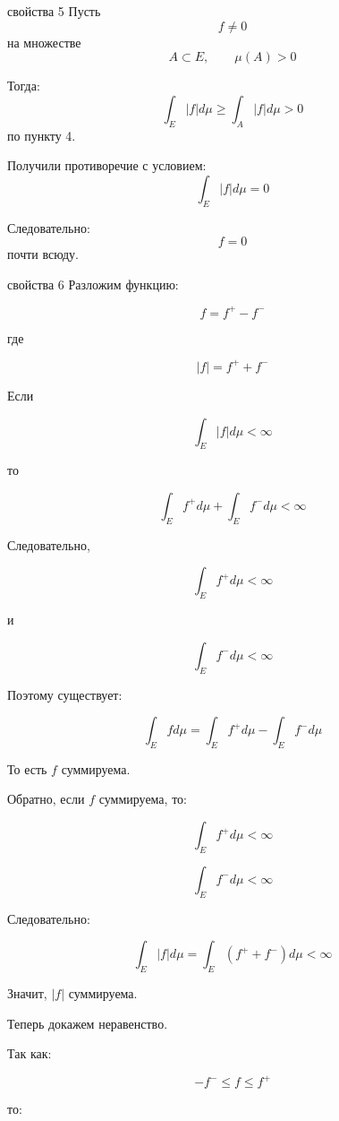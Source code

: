 \documentclass[12pt,a4paper]{article}
\begin{document}
\begin{proofbox}{свойства 5}
    Пусть
    \[
        f\neq0
    \]
    на множестве
    \[
        A\subset E,
        \qquad
        \mu(A)>0
    \]

    Тогда:
    \[
        \int_E|f| d\mu
        \geq
        \int_A|f| d\mu>0
    \]
    по пункту 4.

    Получили противоречие с условием:
    \[
        \int_E|f| d\mu=0
    \]

    Следовательно:
    \[
        f=0
    \]
    почти всюду.
\end{proofbox}

\begin{proofbox}{свойства 6}
    Разложим функцию:

    \[
        f=f^+-f^-
    \]

    где

    \[
        |f|=f^++f^-
    \]

    Если

    \[
        \int_E |f| d\mu<\infty
    \]

    то

    \[
        \int_E f^+ d\mu
        +
        \int_E f^- d\mu
        <\infty
    \]

    Следовательно,

    \[
        \int_E f^+ d\mu<\infty
    \]

    и

    \[
        \int_E f^- d\mu<\infty
    \]

    Поэтому существует:

    \[
        \int_E f d\mu
        =
        \int_E f^+ d\mu
        -
        \int_E f^- d\mu
    \]

    То есть $f$ суммируема.

    Обратно, если $f$ суммируема, то:

    \[
        \int_E f^+ d\mu<\infty
    \]

    \[
        \int_E f^- d\mu<\infty
    \]

    Следовательно:

    \[
        \int_E|f| d\mu
        =
        \int_E(f^++f^-) d\mu
        <\infty
    \]

    Значит, $|f|$ суммируема.

    Теперь докажем неравенство.

    Так как:

    \[
        -f^-\leq f\leq f^+
    \]

    то:


\end{proofbox}
\end{document}
